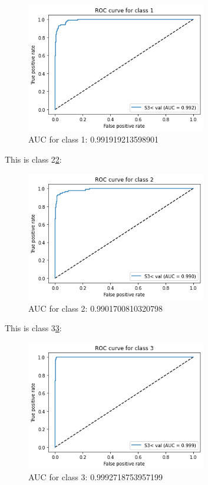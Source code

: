\documentclass[conference]{IEEEtran}
\begin{document}
\begin{figure}[H] 
    \centering %
    \includegraphics[width=0.7\textwidth]{ROC1.png} %
    \caption{AUC for class 1:  0.991919213598901} %
    \label{Fig.ROC1} %
\end{figure}
This is class 2\ref{Fig.ROC2}:
\begin{figure}[H] 
    \centering %
    \includegraphics[width=0.7\textwidth]{ROC2.png} %
    \caption{AUC for class 2:  0.9901700810320798} %
    \label{Fig.ROC2} %
\end{figure}
This is class 3\ref{Fig.ROC3}:
\begin{figure}[H] 
    \centering %
    \includegraphics[width=0.7\textwidth]{ROC3.png} %
    \caption{AUC for class 3:  0.9992718753957199} %
    \label{Fig.ROC3} %
\end{figure}
\end{document}
